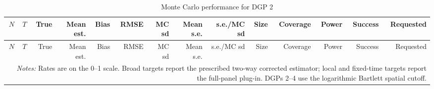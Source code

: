 \begingroup
\small
\begin{longtable}{rrrrrrrrrrrrrr}
\caption{Monte Carlo performance for DGP 2}\label{tab:mc-dgp2}\\
\toprule
$N$ & $T$ & True & Mean est. & Bias & RMSE & MC sd & Mean s.e. & s.e./MC sd & Size & Coverage & Power & Success & Requested \\
\midrule
\endfirsthead
\toprule
$N$ & $T$ & True & Mean est. & Bias & RMSE & MC sd & Mean s.e. & s.e./MC sd & Size & Coverage & Power & Success & Requested \\
\midrule
\endhead
\bottomrule
\multicolumn{14}{p{0.96\linewidth}}{\footnotesize \textit{Notes:} Rates are on the 0--1 scale. Broad targets report the prescribed two-way corrected estimator; local and fixed-time targets report the full-panel plug-in. DGPs 2--4 use the logarithmic Bartlett spatial cutoff.} \\
\end{longtable}
\endgroup
